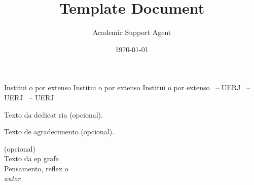 \documentclass{article}
\title{Template Document}
\author{Academic Support Agent}
\date{\today}
\begin{document}
\maketitle




%
\capa
\folhaderosto
%
%
%
%
\fichacatalografica{}
%
%
\begin{folhadeaprovacao}
             {Institui o por extenso}
             {Institui o por extenso}
             {Institui o por extenso}
             {\UERJunidade \UERJunidadenome\ -- UERJ}
             {\UERJunidade \UERJunidadenome\ -- UERJ}
             {\UERJunidade \UERJunidadenome\ -- UERJ}
\end{folhadeaprovacao}
%
%
\vfill
Texto da dedicat ria (opcional).
%
%

Texto de agradecimento (opcional).
%
%
\pretextualchapter{}
  \vfill
  \begin{flushright}
 (opcional)\\
 Texto da ep grafe\\
 Pensamento, reflex o\\    
    \textit{autor}
  \end{flushright}
%
%
\end{document}
